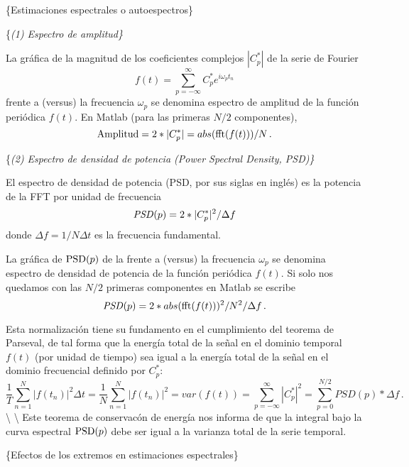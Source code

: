 \documentclass[
]{agujournal2019}
\begin{document}
\vspace{0.25cm}

\{\textbf \large \noindent Estimaciones espectrales o autoespectros\}

\vspace{0.5cm}

\{\it \textbf \noindent (1) Espectro de amplitud\}

La gráfica de la magnitud de los coeficientes complejos \(|C_p^*|\) de
la serie de Fourier
\[f(t)=\sum\limits^\infty_{p=-\infty} C^*_p e^{i\omega_p t_n}\] frente a
(versus) la frecuencia \(\omega_p\) se denomina espectro de amplitud de
la función periódica \(f(t)\). En Matlab (para las primeras \(N/2\)
componentes), \[{\rm Amplitud}=2*|C^*_p|=abs({\rm fft}(f(t)))/N\,.\]

\vspace{0.5cm}

\{\it \textbf \noindent (2) Espectro de densidad de potencia ({\it Power Spectral Density}, PSD)\}

El espectro de densidad de potencia (PSD, por sus siglas en inglés) es
la potencia de la FFT por unidad de frecuencia
\[{\it PSD}(p)=2*|C^*_p|^2/\Delta f\] donde \(\Delta f=1/N\Delta t\) es
la frecuencia fundamental.

La gráfica de \({\rm PSD}(p)\) de la frente a (versus) la frecuencia
\(\omega_p\) se denomina espectro de densidad de potencia de la función
periódica \(f(t)\). Si solo nos quedamos con las \(N/2\) primeras
componentes en Matlab se escribe
\[{\it PSD}(p)=2*abs({\rm fft}(f(t)))^2/N^2/\Delta f\,.\]

Esta normalización tiene su fundamento en el cumplimiento del teorema de
Parseval, de tal forma que la energía total de la señal en el dominio
temporal \(f(t)\) (por unidad de tiempo) sea igual a la energía total de
la señal en el dominio frecuencial definido por \(C^*_p\):
\[\frac{1}{T}\sum\limits^N_{n=1}|f(t_n)|^2 \Delta t =\frac{1}{N}\sum\limits^N_{n=1}|f(t_n)|^2 =
var(f(t))=\sum\limits^{\infty}_{p=-\infty} |C^*_p|^2=\sum\limits^{N/2}_{p=0}PSD(p)*\Delta f\,.\]
\textbackslash{} \textbackslash{} Este teorema de conservacón de energía
nos informa de que la integral bajo la curva espectral \({\rm PSD}(p)\)
debe ser igual a la varianza total de la serie temporal.

\vspace{0.5cm}

\{\textbf \noindent Efectos de los extremos en estimaciones
espectrales\}
\end{document}

